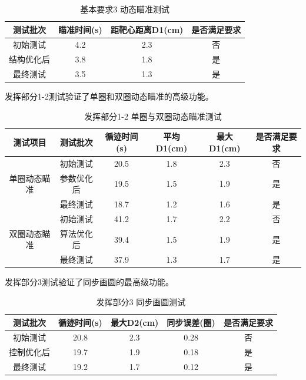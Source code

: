 \documentclass[12pt,a4paper]{ctexart}
\begin{document}
\begin{table}[H]
    \centering
    \footnotesize
    \caption{基本要求3 动态瞄准测试}
    \label{tab:basic_req3}
    \begin{tabular}{|c|c|c|c|}
        \hline
        测试批次 & 瞄准时间(s) & 距靶心距离D1(cm) & 是否满足要求 \\
        \hline
        初始测试 & 4.2 & 2.3 & 否 \\
        \hline
        结构优化后 & 3.8 & 1.8 & 是 \\
        \hline
        最终测试 & 3.5 & 1.3 & 是 \\
        \hline
    \end{tabular}
\end{table}

发挥部分1-2测试验证了单圈和双圈动态瞄准的高级功能。
\begin{table}[H]
    \centering
    \footnotesize
    \caption{发挥部分1-2 单圈与双圈动态瞄准测试}
    \label{tab:advanced_12}
    \begin{tabular}{|c|c|c|c|c|c|}
        \hline
        测试项目 & 测试批次 & 循迹时间(s) & 平均D1(cm) & 最大D1(cm) & 是否满足要求 \\
        \hline
        \multirow{3}{*}{单圈动态瞄准} & 初始测试 & 20.5 & 1.8 & 2.3 & 否 \\
        \cline{2-6}
        & 参数优化后 & 19.5 & 1.5 & 1.9 & 是 \\
        \cline{2-6}
        & 最终测试 & 18.7 & 1.2 & 1.6 & 是 \\
        \hline
        \multirow{3}{*}{双圈动态瞄准} & 初始测试 & 41.2 & 1.7 & 2.2 & 否 \\
        \cline{2-6}
        & 算法优化后 & 39.4 & 1.5 & 1.9 & 是 \\
        \cline{2-6}
        & 最终测试 & 37.9 & 1.3 & 1.7 & 是 \\
        \hline
    \end{tabular}
\end{table}

发挥部分3测试验证了同步画圆的最高级功能。
\begin{table}[H]
    \centering
    \footnotesize
    \caption{发挥部分3 同步画圆测试}
    \label{tab:advanced_3}
    \begin{tabular}{|c|c|c|c|c|}
        \hline
        测试批次 & 循迹时间(s) & 最大D2(cm) & 同步误差(圈) & 是否满足要求 \\
        \hline
        初始测试 & 20.8 & 2.3 & 0.28 & 否 \\
        \hline
        控制优化后 & 19.7 & 1.9 & 0.18 & 是 \\
        \hline
        最终测试 & 19.2 & 1.7 & 0.12 & 是 \\
        \hline
    \end{tabular}
\end{table}
\end{document}
